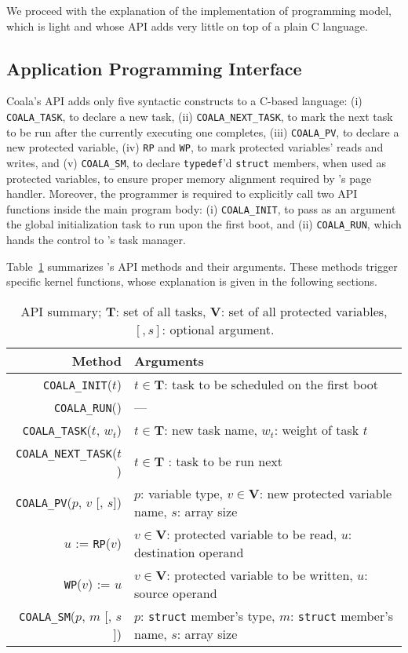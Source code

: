 We proceed with the explanation of the implementation of \sys programming model, which is light and whose API adds very little on top of a plain C language.

\subsection{Application Programming Interface}
\label{sec:coala_api}

Coala's API adds only five syntactic constructs to a C-based language: (i) \texttt{COALA\_TASK}, to declare a new task, (ii) \texttt{COALA\_NEXT\_TASK}, to mark the next task to be run after the currently executing one completes, (iii) \texttt{COALA\_PV}, to declare a new protected variable, (iv) \texttt{RP} and \texttt{WP}, to mark protected variables' reads and writes, and (v) \texttt{COALA\_SM}, to declare \texttt{typedef}'d \texttt{struct} members, when used as protected variables, to ensure proper memory alignment required by \sys's page handler. Moreover, the programmer is required to explicitly call two API functions inside the main program body: (i) \texttt{COALA\_INIT}, to pass as an argument the global initialization task to run upon the first boot, and (ii) \texttt{COALA\_RUN}, which hands the control to \sys's task manager.

Table~\ref{table:coala_api} summarizes \sys's API methods and their arguments. These methods trigger specific \sys kernel functions, whose explanation is given in the following sections.

\begin{table}
\centering
\begin{tabular}{| r | p{} |}
	\hline
	{Method} & {Arguments} \\
	\hline\hline
	\texttt{COALA\_INIT}($t$) & $t \in \mathbf{T}$: task to be scheduled on the first boot \\
	\hline
	\texttt{COALA\_RUN}() & --- \\
	\hline
	\texttt{COALA\_TASK}($t$, $w_t$) & $t \in \mathbf{T}$: new task name, $w_t$: weight of task $t$ \\
	\hline
	\texttt{COALA\_NEXT\_TASK}($t$) & $t \in \mathbf{T}$ : task to be run next \\
	\hline
	\texttt{COALA\_PV}($p$, $v$ [, $s$]) & $p$: variable type, $v \in \mathbf{V}$: new protected variable name, $s$: array size \\
	\hline
	$u$ := \texttt{RP}($v$) & $v \in \mathbf{V}$: protected variable to be read, $u$: destination operand \\
	\hline	
	\texttt{WP}($v$) := $u$ &  $v \in \mathbf{V}$: protected variable to be written, $u$: source operand \\
	\hline
	\texttt{COALA\_SM}($p$, $m$ [, $s$]) & $p$: \texttt{struct} member's type, $m$: \texttt{struct} member's name, $s$: array size \\
	\hline
\end{tabular}
\caption{API summary; $\mathbf{T}$: set of all tasks, $\mathbf{V}$: set of all protected variables, $[, s]$: optional argument.}
\label{table:coala_api}
\end{table}

